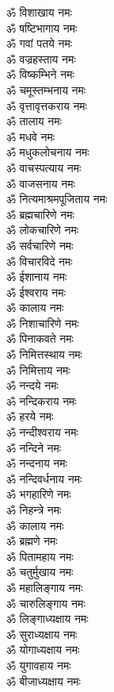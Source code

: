 \begin{multicols}{2}
\begin{flushleft}
ॐ विशाखाय नमः\\
ॐ षष्टिभागाय नमः\\
ॐ गवां पतये नमः\\
ॐ वज्रहस्ताय नमः\\
ॐ विष्कम्भिने नमः\\
ॐ चमूस्तम्भनाय नमः\\
ॐ वृत्तावृत्तकराय नमः\\
ॐ तालाय नमः\\
ॐ मधवे नमः\\
ॐ मधुकलोचनाय नमः\hfill{}\\
ॐ वाचस्पत्याय नमः\\
ॐ वाजसनाय नमः\\
ॐ नित्यमाश्रमपूजिताय नमः\\
ॐ ब्रह्मचारिणे नमः\\
ॐ लोकचारिणे नमः\\
ॐ सर्वचारिणे नमः\\
ॐ विचारविदे नमः\\
ॐ ईशानाय नमः\\
ॐ ईश्वराय नमः\\
ॐ कालाय नमः\hfill{}\\
ॐ निशाचारिणे नमः\\
ॐ पिनाकवते नमः\\
ॐ निमित्तस्थाय नमः\\
ॐ निमित्ताय नमः\\
ॐ नन्दये नमः\\
ॐ नन्दिकराय नमः\\
ॐ हरये नमः\\
ॐ नन्दीश्वराय नमः\\
ॐ नन्दिने नमः\\
ॐ नन्दनाय नमः\hfill{}\\
ॐ नन्दिवर्धनाय नमः\\
ॐ भगहारिणे नमः\\
ॐ निहन्त्रे नमः\\
ॐ कालाय नमः\\
ॐ ब्रह्मणे नमः\\
ॐ पितामहाय नमः\\
ॐ चतुर्मुखाय नमः\\
ॐ महालिङ्गाय नमः\\
ॐ चारुलिङ्गाय नमः\\
ॐ लिङ्गाध्यक्षाय नमः\hfill{}\\
ॐ सुराध्यक्षाय नमः\\
ॐ योगाध्यक्षाय नमः\\
ॐ युगावहाय नमः\\
ॐ बीजाध्यक्षाय नमः\\

\end{flushleft}
\end{multicols}
